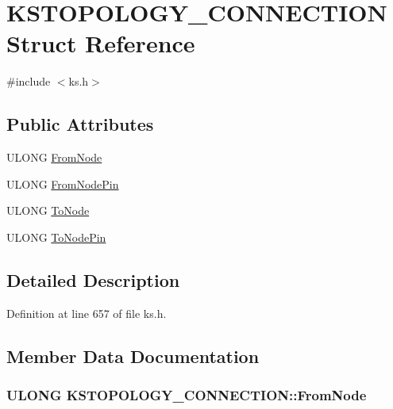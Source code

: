 \hypertarget{struct_k_s_t_o_p_o_l_o_g_y___c_o_n_n_e_c_t_i_o_n}{}\section{K\+S\+T\+O\+P\+O\+L\+O\+G\+Y\+\_\+\+C\+O\+N\+N\+E\+C\+T\+I\+ON Struct Reference}
\label{struct_k_s_t_o_p_o_l_o_g_y___c_o_n_n_e_c_t_i_o_n}


{\ttfamily \#include $<$ks.\+h$>$}

\subsection*{Public Attributes}
\begin{DoxyCompactItemize}
\item 
U\+L\+O\+NG \hyperlink{struct_k_s_t_o_p_o_l_o_g_y___c_o_n_n_e_c_t_i_o_n_a75a208d59c66bf845c61558ec1ade1c0}{From\+Node}
\item 
U\+L\+O\+NG \hyperlink{struct_k_s_t_o_p_o_l_o_g_y___c_o_n_n_e_c_t_i_o_n_a9e22f65bb8f2db9b15707ef432f89a59}{From\+Node\+Pin}
\item 
U\+L\+O\+NG \hyperlink{struct_k_s_t_o_p_o_l_o_g_y___c_o_n_n_e_c_t_i_o_n_ab0678397d20a741ce251cc6922f7aacb}{To\+Node}
\item 
U\+L\+O\+NG \hyperlink{struct_k_s_t_o_p_o_l_o_g_y___c_o_n_n_e_c_t_i_o_n_a1ed3b50b7c388036d1eadb89e06d18a1}{To\+Node\+Pin}
\end{DoxyCompactItemize}


\subsection{Detailed Description}


Definition at line 657 of file ks.\+h.



\subsection{Member Data Documentation}
\subsubsection[{\texorpdfstring{From\+Node}{FromNode}}]{\setlength{\rightskip}{0pt plus 5cm}U\+L\+O\+NG K\+S\+T\+O\+P\+O\+L\+O\+G\+Y\+\_\+\+C\+O\+N\+N\+E\+C\+T\+I\+O\+N\+::\+From\+Node}\hypertarget{struct_k_s_t_o_p_o_l_o_g_y___c_o_n_n_e_c_t_i_o_n_a75a208d59c66bf845c61558ec1ade1c0}{}\label{struct_k_s_t_o_p_o_l_o_g_y___c_o_n_n_e_c_t_i_o_n_a75a208d59c66bf845c61558ec1ade1c0}


